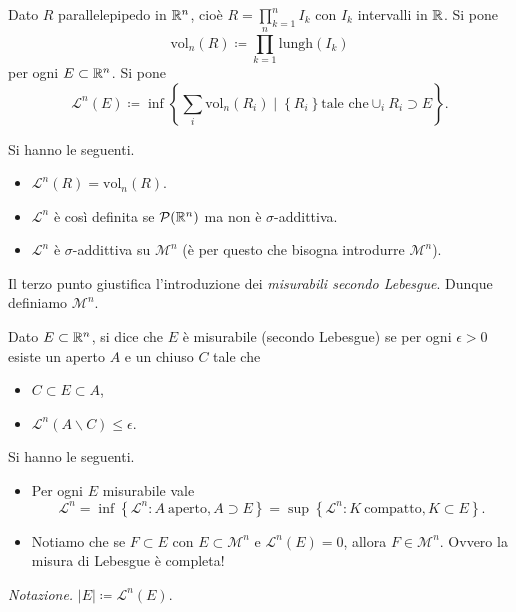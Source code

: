 \documentclass[a4paper, 11pt]{report}
\begin{document}
Dato $R$ parallelepipedo in $\mathbb R^n$, cioè $R = \prod_{k=1}^{n} I_k $ con $I_k$ intervalli in $\mathbb R$.
Si pone
\[
	\mathrm{vol}_n (R) \coloneqq \prod_{k=1}^{n}  \mathrm{lungh} (I_k)
\] 
per ogni $E \subset \mathbb R^n$. Si pone
\[
	\mathcal{L}^n(E) \coloneqq \inf \left\{ \sum_{i}^{} \mathrm{vol}_n (R_i) \mid \left\{ R_i \right\} \text{tale che} \cup_i R_i \supset E  \right\}.
\] 
\begin{osservazione}
Si hanno le seguenti.
\begin{itemize}[label={--}]
	\item $\mathcal{L}^n(R) = \mathrm{vol}_n (R)$.
	\item $\mathcal{L}^n$ è così definita se $\mathcal{P}(\mathbb R^n)$ ma non è $\sigma$-addittiva.
	\item $\mathcal{L}^n$ è $\sigma$-addittiva su $\mathcal{M}^n$ (è per questo che bisogna introdurre $\mathcal{M}^n$).
\end{itemize}
\end{osservazione}
%
Il terzo punto giustifica l'introduzione dei \textit{misurabili secondo Lebesgue}. Dunque definiamo $\mathcal{M}^n$.

Dato $E \subset \mathbb R^n$, si dice che $E$ è misurabile (secondo Lebesgue) se per ogni $\epsilon > 0$ esiste un aperto $A$ e un chiuso $C$ tale che
\begin{itemize}[label={--}]
	\item $C \subset E \subset A$,
	\item $\mathcal{L}^n (A \smallsetminus C) \leq \epsilon$.
\end{itemize}
%
\begin{osservazione}
Si hanno le seguenti.
\begin{itemize}[label={--}]
	\item Per ogni $E$ misurabile vale
	\[
	\mathcal{L}^n = \inf \left\{ \mathcal{L}^n \colon A \ \text{aperto}, A \supset E \right\} = \sup \left\{ \mathcal{L}^n \colon K \ \text{compatto}, K \subset E \right\}.
	\] 
	\item Notiamo che se $F \subset E$ con $E \subset \mathcal{M}^n$ e $\mathcal{L}^n(E) = 0$, allora $F \in \mathcal{M}^n$. Ovvero la misura di Lebesgue è completa!
\end{itemize}
%
\textit{Notazione.} $\left| E \right| \coloneqq \mathcal{L}^n (E).$
%
\end{osservazione}
\end{document}

